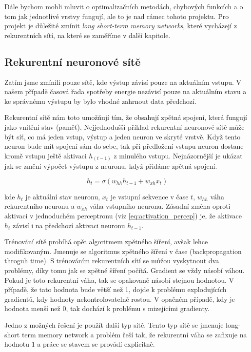 \documentclass[FM,BP,fonts]{tulthesis}
\begin{document}
Dále bychom mohli mluvit o optimalizačních metodách, chybových funkcích a o tom jak jednotlivé vrstvy fungují, ale to je nad rámec tohoto projektu. Pro projekt je důležité zmínit \textit{long short-term memory networks}, které vycházejí z rekurentních sítí, na které se zaměříme v další kapitole.


\subsection{Rekurentní neuronové sítě}
Zatím jsme zmínili pouze sítě, kde výstup závisí pouze na aktuálním vstupu. V našem případě časová řada spotřeby energie nezávisí pouze na aktuálním stavu a ke správnému výstupu by bylo vhodné zahrnout data předchozí.

Rekurentní sítě nám toto umožňují tím, že obsahují zpětná spojení, která fungují jako vnitřní stav (paměť). Nejjednodušší příklad rekurentní neuronové sítě může být síť, co má jeden vstup, výstup a jeden neuron ve skryté vrstvě. Když tento neuron bude mít spojení sám do sebe, tak při předložení vstupu neuron dostane kromě vstupu ještě aktivaci $h_{(t-1)}$ z minulého vstupu. Nejnázornější je ukázat jak se změní výpočet výstupu z neuronu, když přidáme zpětná spojení.


\begin{equation}
	h_t = \sigma(w_{hh}h_{t-1} + w_{xh}x_t)
\end{equation}

kde $h_t$ je aktuální stav neuronu, $x_t$ je vstupní sekvence v čase $t$, $w_{hh}$ váha rekurentního neuronu a $w_{xh}$ váha vstupního neuronu. Zásadní změna oproti aktivaci v jednoduchém perceptronu (viz \ref{eq:activation_percep})  je, že aktivace $h_t$ závisí i na předchozí aktivaci neuronu $h_{t-1}$.

Trénování sítě probíhá opět algoritmem zpětného šíření, avšak lehce modifikovaným. Jmenuje se algoritmus zpětného šíření v čase (backpropagation throguh time). S trénováním rekurentních sítí se můžou vyskytnout dva problémy, díky tomu jak se zpětné šíření počítá. \cite{martinpilatRNN} Gradient se vždy násobí váhou. Pokud je toto rekurentní váha, tak se opakovaně násobí stejnou hodnotou. V případě, že tato hodnota bude větší než 1, dojde k problému explodujících gradientů, kdy hodnoty nekontrolovatelně rostou. V opačném případě, kdy je hodnota menší než 0, tak dochází k problému s mizejícími gradienty.

Jedno z možných řešení je použít další typ sítě. Tento typ sítě se jmenuje long-short term memory network a problém řeší tak, že rekurentní váha se zafixuje na hodnotu 1 a práce se stavem se provádí explicitně.
\end{document}
